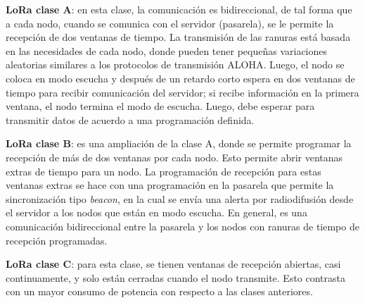 \textbf{LoRa clase A}: en esta clase, la comunicación es bidireccional, de tal forma que a cada nodo, cuando se comunica con el servidor (pasarela), se le permite la recepción de dos ventanas de tiempo. La transmisión de las ranuras está basada en las necesidades de cada nodo, donde pueden tener pequeñas variaciones aleatorias similares a los protocolos de transmisión ALOHA. Luego, el nodo se coloca en modo escucha y después de un retardo corto espera en dos ventanas de tiempo para recibir comunicación del servidor; si recibe información en la primera ventana, el nodo termina el modo de escucha. Luego, debe esperar para transmitir datos de acuerdo a una programación definida.

\textbf{LoRa clase B}: es una ampliación de la clase A, donde se permite programar la recepción de más de dos ventanas por cada nodo. Esto permite abrir ventanas extras de tiempo para un nodo. La programación de recepción para estas ventanas extras se hace con una programación en la pasarela que permite la sincronización tipo \emph{beacon}, en la cual se envía una alerta por radiodifusión desde el servidor a los nodos que están en modo escucha. En general, es una comunicación bidireccional entre la pasarela y los nodos con ranuras de tiempo de recepción programadas.

\textbf{LoRa clase C}: para esta clase, se tienen ventanas de recepción abiertas, casi continuamente, y solo están cerradas cuando el nodo transmite. Esto contrasta con un mayor consumo de potencia con respecto a las clases anteriores.

\newpage\thispagestyle{empty}
